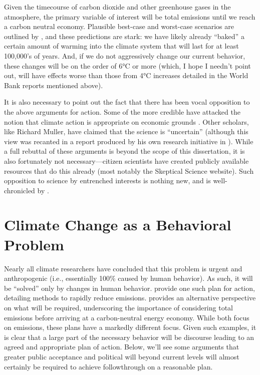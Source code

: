 Given the timecourse of carbon dioxide and other greenhouse gases in the
atmosphere, the primary variable of interest will be total emissions until we
reach a carbon neutral economy. Plausible best-case and worst-case scenarios are
outlined by \textcite{archer_millennial_2008}, and these predictions are stark:
we have likely already “baked” a certain amount of warming into the climate
system that will last for at least 100,000's of years. And, if we do not
aggressively change our current behavior, these changes will be on the order of
6°C or more (which, I hope I needn't point out, will have effects worse than
those from 4°C increases detailed in the World Bank reports mentioned above).

It is also necessary to point out the fact that there has been vocal opposition
to the above arguments for action. Some of the more credible have attacked the
notion that climate action is appropriate on economic grounds
\parencite[e.g.,][]{lomborg_cool_2007}. Other scholars, like Richard Muller,
have claimed that the science is “uncertain” (although this view was
recanted in a report produced by his own research initiative
in \cite{rohde_new_2013}). 
While a full rebuttal of these arguments is beyond the
scope of this dissertation, it is also fortunately not necessary---citizen
scientists have created publicly available resources that do this already (most
notably the Skeptical Science website).  Such opposition to science by
entrenched interests is nothing new, and is well-chronicled by
\textcite{oreskes_merchants_2010}.

\section{Climate Change as a Behavioral Problem}

Nearly all climate researchers have concluded that this problem is urgent and
anthropogenic (i.e., essentially 100\% caused by human behavior). 
As such, it will be ``solved'' only by changes in human behavior.
\textcite{harte_cool_2008} provide one such plan for action, detailing methods
to rapidly reduce emissions. \textcite{schrag_hope_2011} provides an alternative
perspective on what will be required, underscoring the importance of considering
total emissions before arriving at a carbon-neutral energy economy. While both
focus on emissions, these plans have a markedly different focus. Given such
examples, it is clear that a large part of the necessary behavior will be
discourse leading to an agreed and appropriate plan of action. Below, we'll see
some arguments that greater public acceptance and political will beyond
current levels will almost certainly be required to achieve followthrough on a
reasonable plan.

